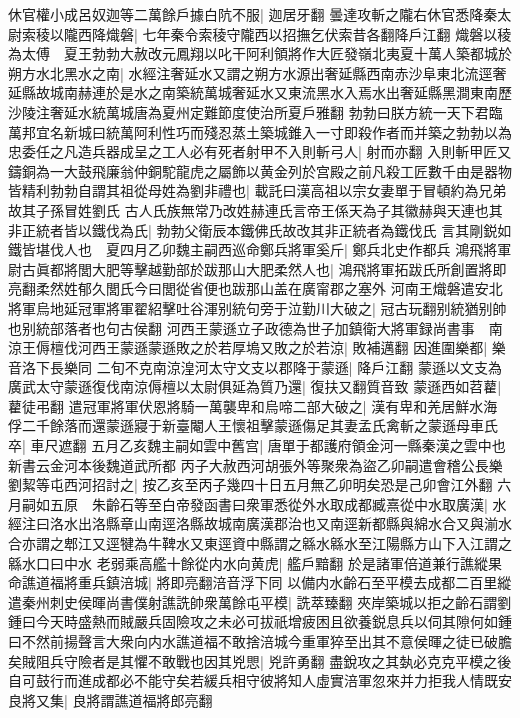 休官權小成呂奴迦等二萬餘戶據白阬不服|{
	迦居牙翻}
曇達攻斬之隴右休官悉降秦太尉索稜以隴西降熾磐|{
	七年秦令索稜守隴西以招撫乞伏索昔各翻降戶江翻}
熾磐以稜為太傅　夏王勃勃大赦改元鳳翔以叱干阿利領將作大匠發嶺北夷夏十萬人築都城於朔方水北黑水之南|{
	水經注奢延水又謂之朔方水源出奢延縣西南赤沙阜東北流逕奢延縣故城南赫連於是水之南築統萬城奢延水又東流黑水入焉水出奢延縣黑澗東南歷沙陵注奢延水統萬城唐為夏州定難節度使治所夏戶雅翻}
勃勃曰朕方統一天下君臨萬邦宜名新城曰統萬阿利性巧而殘忍蒸土築城錐入一寸即殺作者而并築之勃勃以為忠委任之凡造兵器成呈之工人必有死者射甲不入則斬弓人|{
	射而亦翻}
入則斬甲匠又鑄銅為一大鼓飛廉翁仲銅駝龍虎之屬飾以黄金列於宫殿之前凡殺工匠數千由是器物皆精利勃勃自謂其祖從母姓為劉非禮也|{
	載託曰漢高祖以宗女妻單于冒頓約為兄弟故其子孫冒姓劉氏}
古人氏族無常乃改姓赫連氏言帝王係天為子其徽赫與天連也其非正統者皆以鐵伐為氏|{
	勃勃父衛辰本鐵佛氏故改其非正統者為鐵伐氏}
言其剛鋭如鐵皆堪伐人也　夏四月乙卯魏主嗣西巡命鄭兵將軍奚斤|{
	鄭兵北史作都兵}
鴻飛將軍尉古眞都將閭大肥等擊越勤部於跋那山大肥柔然人也|{
	鴻飛將軍拓跋氏所創置將即亮翻柔然姓郁久閭氏今曰閭從省便也跋那山盖在廣甯郡之塞外}
河南王熾磐遣安北將軍烏地延冠軍將軍翟紹擊吐谷渾别統句旁于泣勤川大破之|{
	冠古玩翻别統猶别帥也别統部落者也句古侯翻}
河西王蒙遜立子政德為世子加鎮衛大將軍録尚書事　南涼王傉檀伐河西王蒙遜蒙遜敗之於若厚塢又敗之於若涼|{
	敗補邁翻}
因進圍樂都|{
	樂音洛下長樂同}
二旬不克南涼湟河太守文支以郡降于蒙遜|{
	降戶江翻}
蒙遜以文支為廣武太守蒙遜復伐南涼傉檀以太尉俱延為質乃還|{
	復扶又翻質音致}
蒙遜西如苕藋|{
	藋徒弔翻}
遣冠軍將軍伏恩將騎一萬襲卑和烏啼二部大破之|{
	漢有卑和羌居鮮水海}
俘二千餘落而還蒙遜寢于新臺閹人王懷祖擊蒙遜傷足其妻孟氏禽斬之蒙遜母車氏卒|{
	車尺遮翻}
五月乙亥魏主嗣如雲中舊宫|{
	唐單于都護府領金河一縣秦漢之雲中也新書云金河本後魏道武所都}
丙子大赦西河胡張外等聚衆為盜乙卯嗣遣會稽公長樂劉絜等屯西河招討之|{
	按乙亥至丙子幾四十日五月無乙卯明矣恐是己卯會江外翻}
六月嗣如五原　朱齡石等至白帝發函書曰衆軍悉從外水取成都臧熹從中水取廣漢|{
	水經注曰洛水出洛縣章山南逕洛縣故城南廣漢郡治也又南逕新都縣與綿水合又與湔水合亦謂之郫江又逕犍為牛鞞水又東逕資中縣謂之緜水緜水至江陽縣方山下入江謂之緜水口曰中水}
老弱乘高艦十餘從内水向黄虎|{
	艦戶黯翻}
於是諸軍倍道兼行譙縱果命譙道福將重兵鎮涪城|{
	將即亮翻涪音浮下同}
以備内水齡石至平模去成都二百里縱遣秦州刺史侯暉尚書僕射譙詵帥衆萬餘屯平模|{
	詵萃臻翻}
夾岸築城以拒之齡石謂劉鍾曰今天時盛熱而賊嚴兵固險攻之未必可拔祇增疲困且欲養鋭息兵以伺其隙何如鍾曰不然前揚聲言大衆向内水譙道福不敢捨涪城今重軍猝至出其不意侯暉之徒已破膽矣賊阻兵守險者是其懼不敢戰也因其兇愳|{
	兇許勇翻}
盡銳攻之其埶必克克平模之後自可鼓行而進成都必不能守矣若緩兵相守彼將知人虛實涪軍忽來并力拒我人情既安良將又集|{
	良將謂譙道福將郎亮翻}
